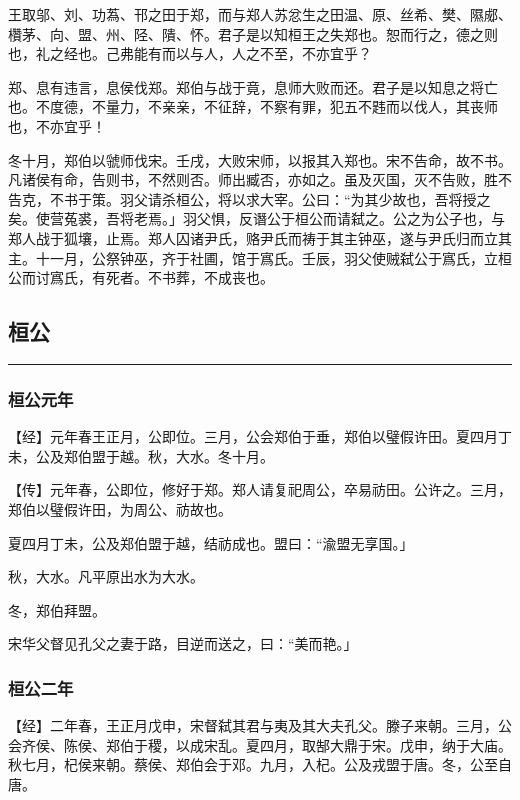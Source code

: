 \documentclass[]{article}
\begin{document}
王取邬、刘、功蒍、邗之田于郑，而与郑人苏忿生之田温、原、丝希、樊、隰郕、欑茅、向、盟、州、陉、隤、怀。君子是以知桓王之失郑也。恕而行之，德之则也，礼之经也。己弗能有而以与人，人之不至，不亦宜乎？

郑、息有违言，息侯伐郑。郑伯与战于竟，息师大败而还。君子是以知息之将亡也。不度德，不量力，不亲亲，不征辞，不察有罪，犯五不韪而以伐人，其丧师也，不亦宜乎！

冬十月，郑伯以虢师伐宋。壬戌，大败宋师，以报其入郑也。宋不告命，故不书。凡诸侯有命，告则书，不然则否。师出臧否，亦如之。虽及灭国，灭不告败，胜不告克，不书于策。羽父请杀桓公，将以求大宰。公曰：``为其少故也，吾将授之矣。使营菟裘，吾将老焉。」羽父惧，反谮公于桓公而请弑之。公之为公子也，与郑人战于狐壤，止焉。郑人囚诸尹氏，赂尹氏而祷于其主钟巫，遂与尹氏归而立其主。十一月，公祭钟巫，齐于社圃，馆于寪氏。壬辰，羽父使贼弑公于寪氏，立桓公而讨寪氏，有死者。不书葬，不成丧也。

\hypertarget{header-n157}{%
\subsection{桓公}\label{header-n157}}

\begin{center}\rule{0.5\linewidth}{\linethickness}\end{center}

\hypertarget{header-n159}{%
\subsubsection{桓公元年}\label{header-n159}}

【经】元年春王正月，公即位。三月，公会郑伯于垂，郑伯以璧假许田。夏四月丁未，公及郑伯盟于越。秋，大水。冬十月。

【传】元年春，公即位，修好于郑。郑人请复祀周公，卒易祊田。公许之。三月，郑伯以璧假许田，为周公、祊故也。

夏四月丁未，公及郑伯盟于越，结祊成也。盟曰：``渝盟无享国。」

秋，大水。凡平原出水为大水。

冬，郑伯拜盟。

宋华父督见孔父之妻于路，目逆而送之，曰：``美而艳。」

\hypertarget{header-n168}{%
\subsubsection{桓公二年}\label{header-n168}}

【经】二年春，王正月戊申，宋督弑其君与夷及其大夫孔父。滕子来朝。三月，公会齐侯、陈侯、郑伯于稷，以成宋乱。夏四月，取郜大鼎于宋。戊申，纳于大庙。秋七月，杞侯来朝。蔡侯、郑伯会于邓。九月，入杞。公及戎盟于唐。冬，公至自唐。
\end{document}
